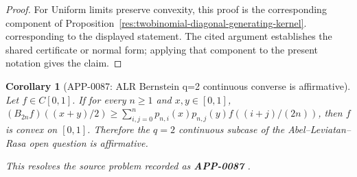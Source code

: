 \documentclass[11pt]{article}
\numberwithin{equation}{section}
\newtheorem{corollary}[theorem]{Corollary}
\theoremstyle{definition}
\theoremstyle{remark}
\newcommand{\1}{\mathbf 1}
\begin{document}
\begin{proof}
For Uniform limits preserve convexity, this proof is the corresponding component of Proposition~\ref{res:twobinomial-diagonal-generating-kernel}.  corresponding to the displayed statement.  The cited argument establishes the shared certificate or normal form; applying that component to the present notation gives the claim.
\end{proof}

\begin{corollary}[APP-0087: ALR Bernstein q=2 continuous converse is affirmative]
\label{res:alr-openquestion-q2-continuous-affirmative}
Let \(f\in C[0,1]\). If for every \(n\ge1\) and \(x,y\in[0,1]\), \((B_{2n}f)((x+y)/2)\ge\sum_{i,j=0}^{n}p_{n,i}(x)p_{n,j}(y)f((i+j)/(2n))\), then \(f\) is convex on \([0,1]\). Therefore the \(q=2\) continuous subcase of the Abel--Leviatan--Rasa open question is affirmative.



This resolves the source problem recorded as \textbf{APP-0087} \cite{app-app-0087-source}.
\end{corollary}
\end{document}
